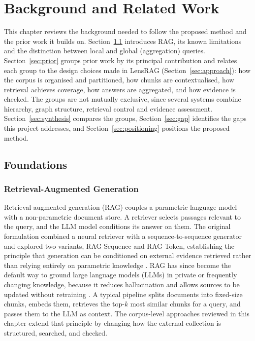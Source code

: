 \documentclass[11pt,letterpaper,oneside]{report}
\begin{document}
\chapter{Background and Related Work}
\label{ch:related}

This chapter reviews the background needed to follow the proposed method and
the prior work it builds on. Section~\ref{sec:foundations} introduces RAG,
its known limitations and the distinction between local and global
(aggregation) queries. Section~\ref{sec:prior} groups prior work by its
principal contribution and relates each group to the design choices made in
LensRAG (Section~\ref{sec:approach}): how the corpus is organised and
partitioned, how chunks are contextualised, how retrieval achieves coverage,
how answers are aggregated, and how evidence is checked. The groups are not
mutually exclusive, since several systems combine hierarchy, graph structure,
retrieval control and evidence assessment. Section~\ref{sec:synthesis}
compares the groups, Section~\ref{sec:gap} identifies the gaps this project
addresses, and Section~\ref{sec:positioning} positions the proposed method.

\section{Foundations}
\label{sec:foundations}

\subsection{Retrieval-Augmented Generation}
Retrieval-augmented generation (RAG) couples a parametric language model with
a non-parametric document store. A retriever selects passages relevant to the
query, and the LLM model conditions its answer on them. The original
formulation combined a neural retriever with a sequence-to-sequence generator
and explored two variants, RAG-Sequence and RAG-Token, establishing the
principle that generation can be conditioned on external evidence
retrieved rather than relying entirely on parametric knowledge \citep{lewis2020rag}.
RAG has since become the default way to ground large language models (LLMs)
in private or frequently changing knowledge, because it reduces hallucination
and allows sources to be updated without retraining
\citep{gao2023ragsurvey}. A typical pipeline splits documents into fixed-size
chunks, embeds them, retrieves the top-$k$ most similar chunks for a query,
and passes them to the LLM as context. The corpus-level approaches reviewed in
this chapter extend that principle by changing how the external collection is
structured, searched, and checked.
\end{document}
